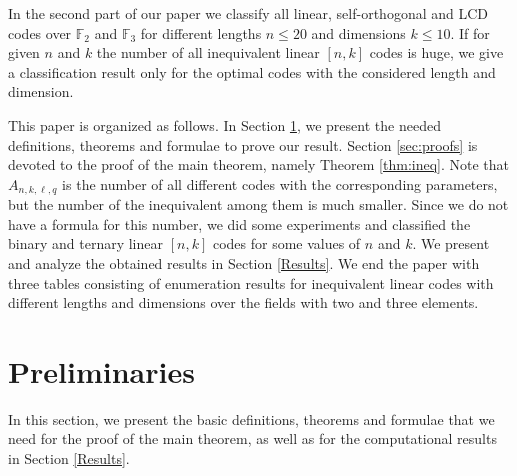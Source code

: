 \documentclass[a4paper,11pt]{article}
\newcommand{\F}{\mathbb{F}}
\begin{document}
In the second part of our paper we classify all linear, self-orthogonal and LCD codes over $\F_2$ and $\F_3$ for different lengths $n\le 20$ and dimensions $k\le 10$. If for given $n$ and $k$ the number of all inequivalent linear $[n,k]$ codes is huge, we give a classification result only for the optimal codes with the considered length and dimension.

This paper is organized as follows. In Section \ref{sect:preliminaries}, we present the needed definitions, theorems and formulae to prove our result. Section \ref{sec:proofs} is devoted to the proof of the main theorem, namely Theorem \ref{thm:ineq}. Note that $A_{n,k,\ell,q}$ is the number of all different codes with the corresponding parameters, but the number of the inequivalent among them is much smaller. Since we do not have a formula for this number, we did some experiments and classified the binary and ternary linear $[n,k]$ codes for some values of $n$ and $k$. We present and analyze the obtained results in Section \ref{Results}. We end the paper with three tables consisting of enumeration results for inequivalent linear codes with different lengths and dimensions over the fields with two and three elements.



\section{Preliminaries}
\label{sect:preliminaries}

 In this section, we present the basic definitions, theorems and formulae that we need for the proof of the main theorem, as well as for the computational results in Section \ref{Results}.
\end{document}
